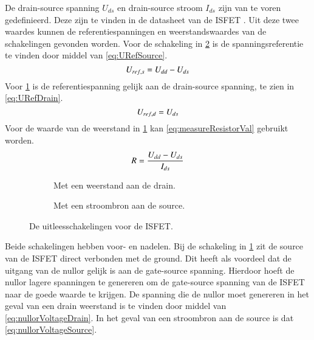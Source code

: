De drain-source spanning $U_{ds}$ en drain-source stroom $I_{ds}$ zijn van te voren gedefinieerd. Deze zijn te vinden in de datasheet van de ISFET \cite{isfet}. Uit deze twee waardes kunnen de referentiespanningen en weerstandswaardes van de schakelingen gevonden worden.
Voor de schakeling in \cref{fig:measureCurrent} is de spanningsreferentie te vinden door middel van \cref{eq:URefSource}.
\begin{equation}\label{eq:URefSource}
    U_{ref,s} = U_{dd} - U_{ds}
    \tagaddtext{[\si{\volt}]}
\end{equation}
Voor \cref{fig:measureResistor} is de referentiespanning gelijk aan de drain-source spanning, te zien in \cref{eq:URefDrain}.
\begin{equation}\label{eq:URefDrain}
    U_{ref,d} = U_{ds}
    \tagaddtext{[\si{\volt}]}
\end{equation}
Voor de waarde van de weerstand in \cref{fig:measureResistor} kan \cref{eq:measureResistorVal} gebruikt worden.
\begin{equation}\label{eq:measureResistorVal}
    R = \frac{U_{dd} - U_{ds}}{I_{ds}}
    \tagaddtext{[\si{\ohm}]}
\end{equation}


\begin{figure}[!htbp]
    \centering
    \begin{subfigure}[b]{0.45\textwidth}
        \centering
        \def\svgwidth{\textwidth}
        
        \caption{Met een weerstand aan de drain.}
        \label{fig:measureResistor}
    \end{subfigure}
    \hfill
    \begin{subfigure}[b]{0.45\textwidth}
        \centering
        \def\svgwidth{\textwidth}
        
        \caption{Met een stroombron aan de source.}
        \label{fig:measureCurrent}
    \end{subfigure}
    \caption{De uitleesschakelingen voor de ISFET.}
    \label{fig:measureCircuits}
\end{figure}

Beide schakelingen hebben voor- en nadelen.
Bij de schakeling in \cref{fig:measureResistor} zit de source van de ISFET direct verbonden met de ground. Dit heeft als voordeel dat de uitgang van de nullor gelijk is aan de gate-source spanning. Hierdoor hoeft de nullor lagere spanningen te genereren om de gate-source spanning van de ISFET naar de goede waarde te krijgen. De spanning die de nullor moet genereren in het geval van een drain weerstand is te vinden door middel van \cref{eq:nullorVoltageDrain}. In het geval van een stroombron aan de source is dat \cref{eq:nullorVoltageSource}.

